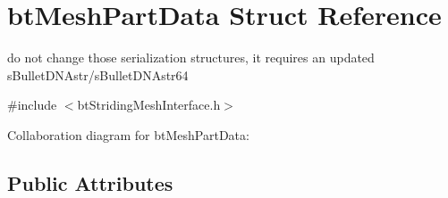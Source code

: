 \hypertarget{structbt_mesh_part_data}{\section{bt\+Mesh\+Part\+Data Struct Reference}
\label{structbt_mesh_part_data}
}


do not change those serialization structures, it requires an updated s\+Bullet\+D\+N\+Astr/s\+Bullet\+D\+N\+Astr64  




{\ttfamily \#include $<$bt\+Striding\+Mesh\+Interface.\+h$>$}



Collaboration diagram for bt\+Mesh\+Part\+Data\+:
\subsection*{Public Attributes}
